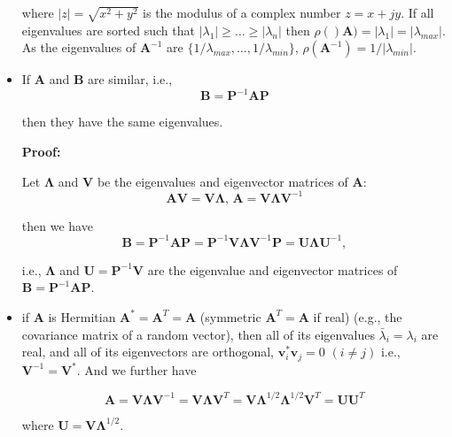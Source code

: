 \documentclass[10pt,b5paper,titlepage]{book}
\begin{document}
\begin{itemize}
where $|z| = \sqrt{x^{2}+y^{2}}$ is the modulus of a complex number $z = x+jy$. If all eigenvalues are sorted such that $|\lambda_{1}| \ge \dots \ge |\lambda_{n}|$ then $\rho()\mathbf{A}) = |\lambda_{1}| = |\lambda_{max}|$. As the eigenvalues of $\mathbf{A}^{-1}$ are $\{1/\lambda_{max},\dots,1/\lambda_{min}\}$, $\rho(\mathbf{A}^{-1}) = 1/|\lambda_{min}|$.

\item If $\mathbf{A}$ and $\mathbf{B}$ are similar, i.e.,
\begin{equation}
\mathbf{B} = \mathbf{P}^{-1}\mathbf{A}\mathbf{P}
\end{equation}

then they have the same eigenvalues.

\textbf{Proof:}

Let $\mathbf{\Lambda}$ and $\mathbf{V}$ be the eigenvalues and eigenvector matrices of $\mathbf{A}$:
\begin{equation}
\mathbf{A}\mathbf{V} = \mathbf{V}\mathbf{\Lambda}
\text{, }
\mathbf{A} = \mathbf{V}\mathbf{\Lambda}\mathbf{V}^{-1}
\end{equation}

then we have
\begin{equation}
\mathbf{B} = \mathbf{P}^{-1}\mathbf{A}\mathbf{P} = \mathbf{P}^{-1}\mathbf{V}\mathbf{\Lambda}\mathbf{V}^{-1}\mathbf{P} = \mathbf{U}\mathbf{\Lambda}\mathbf{U}^{-1}
,\end{equation}

i.e., $\mathbf{\Lambda}$ and $\mathbf{U} = \mathbf{P}^{-1}\mathbf{V}$ are the eigenvalue and eigenvector matrices of $\mathbf{B} = \mathbf{P}^{-1}\mathbf{A}\mathbf{P}$.

\item if $\mathbf{A}$ is Hermitian $\mathbf{A}^{*} = \mathbf{A}^{T} = \mathbf{A}$ (symmetric $\mathbf{A}^{T} = \mathbf{A}$ if real) (e.g., the covariance matrix of a random vector), then all of its eigenvalues $\bar{\lambda}_{i} = \lambda_{i}$ are real, and all of its eigenvectors are orthogonal, $\mathbf{v}_{i}^{*}\mathbf{v}_{j} = 0$ $(i \neq j)$ i.e., $\mathbf{V}^{-1} = \mathbf{V}^{*}$. And we further have

\begin{equation}
\mathbf{A} = \mathbf{V}\mathbf{\Lambda}\mathbf{V}^{-1} = \mathbf{V}\mathbf{\Lambda}\mathbf{V}^{T} = \mathbf{V}\mathbf{\Lambda}^{1/2}\mathbf{\Lambda}^{1/2}\mathbf{V}^{T} = \mathbf{U}\mathbf{U}^{T}
\end{equation}

where $\mathbf{U} = \mathbf{V}\mathbf{\Lambda}^{1/2}$.


\end{itemize}
\end{document}
